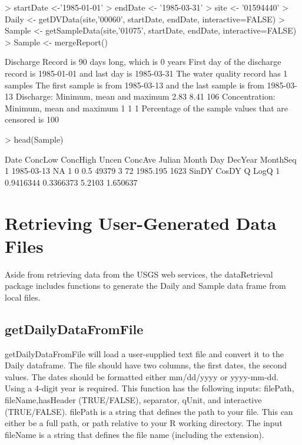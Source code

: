 \documentclass[a4paper,11pt]{article}
\begin{document}
\begin{Schunk}
\begin{Sinput}
> startDate <-'1985-01-01' 
> endDate <- '1985-03-31'
> site <- '01594440'
> Daily <- getDVData(site,'00060', startDate, endDate, interactive=FALSE)
> Sample <- getSampleData(site,'01075', startDate, endDate, interactive=FALSE)
> Sample <- mergeReport()
\end{Sinput}
\begin{Soutput}
 Discharge Record is 90 days long, which is 0 years
 First day of the discharge record is 1985-01-01 and last day is 1985-03-31
 The water quality record has 1 samples
 The first sample is from 1985-03-13 and the last sample is from 1985-03-13
 Discharge: Minimum, mean and maximum 2.83 8.41 106
 Concentration: Minimum, mean and maximum 1 1 1
 Percentage of the sample values that are censored is 100 %
\end{Soutput}
\begin{Sinput}
> head(Sample)
\end{Sinput}
\begin{Soutput}
        Date ConcLow ConcHigh Uncen ConcAve Julian Month Day  DecYear MonthSeq
1 1985-03-13      NA        1     0     0.5  49379     3  72 1985.195     1623
      SinDY     CosDY      Q     LogQ
1 0.9416344 0.3366373 5.2103 1.650637
\end{Soutput}
\end{Schunk}



\newpage
\section{Retrieving User-Generated Data Files}
Aside from retrieving data from the USGS web services, the dataRetrieval package includes functions to generate the Daily and Sample data frame from local files.

\subsection{getDailyDataFromFile}
getDailyDataFromFile will load a user-supplied text file and convert it to the Daily dataframe. The file should have two columns, the first dates, the second values.  The dates should be formatted either mm/dd/yyyy or yyyy-mm-dd. Using a 4-digit year is required. This function has the following inputs: filePath, fileName,hasHeader (TRUE/FALSE), separator, qUnit, and interactive (TRUE/FALSE). filePath is a string that defines the path to your file. This can either be a full path, or path relative to your R working directory. The input fileName is a string that defines the file name (including the extension).
\end{document}
